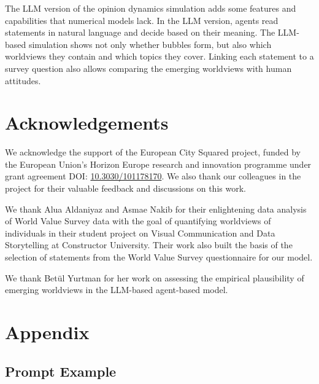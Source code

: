 \documentclass[]{ceurart}
\begin{document}
The LLM version of the opinion dynamics simulation adds some features
and capabilities that numerical models lack. In the LLM version, agents
read statements in natural language and decide based on their meaning.
The LLM-based simulation shows not only whether bubbles form, but also
which worldviews they contain and which topics they cover. Linking each
statement to a survey question also allows comparing the emerging
worldviews with human attitudes.

\section*{Acknowledgements}\label{acknowledgements}

We acknowledge the support of the European City Squared project, funded
by the European Union's Horizon Europe research and innovation programme
under grant agreement DOI:
\href{https://doi.org/10.3030/101178170}{10.3030/101178170}. We also
thank our colleagues in the project for their valuable feedback and
discussions on this work.

We thank Alua Aldaniyaz and Asmae Nakib for their enlightening data
analysis of World Value Survey data with the goal of quantifying
worldviews of individuals in their student project on Visual
Communication and Data Storytelling at Constructor University. Their
work also built the basis of the selection of statements from the World
Value Survey questionnaire for our model.

We thank Betül Yurtman for her work on assessing the empirical
plausibility of emerging worldviews in the LLM-based agent-based model.

\appendix
\section{Appendix}

\subsection{Prompt Example}
\end{document}
